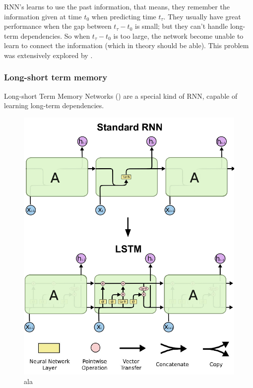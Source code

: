 \documentclass[12pt]{report}
\begin{document}
RNN's learns to use the past information, that means, they remember the information given at time $t_0$ when predicting time $t_\tau$. They usually have great performance when the gap between $t_\tau - t_0$ is small; but they can't handle long-term dependencies. So when $t_\tau - t_0$ is too large, the network become unable to learn to connect the information (which in theory should be able). This problem was extensively explored by \citet{bengio1994learning}.

\subsubsection{Long-short term memory}

Long-short Term Memory Networks (\citet{hochreiter1997long}) are a special kind of RNN, capable of learning long-term dependencies.

\begin{figure}[!h]
\centering
\includegraphics[height=\textheight/2]{lstm1.pdf}
\caption{ala}
\label{fig:lstm1}
\end{figure}
\end{document}

